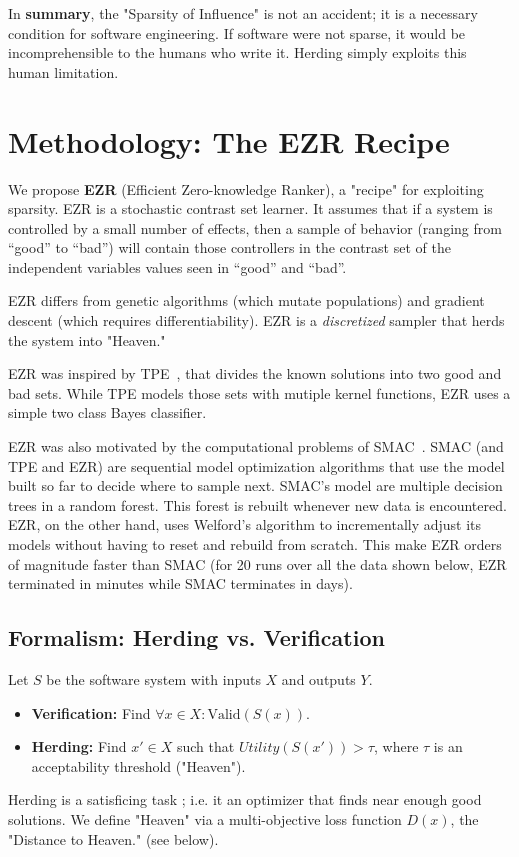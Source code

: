 \documentclass[runningheads]{llncs}
\begin{document}
In {\bf summary}, the "Sparsity of Influence" is not an accident; it is a 
necessary condition for software engineering. If software were not sparse, 
it would be incomprehensible to the humans who write it. Herding simply 
exploits this human limitation.

\section{Methodology: The EZR Recipe}
We propose \textbf{EZR} (Efficient Zero-knowledge Ranker), a "recipe" for 
exploiting sparsity. EZR is a stochastic contrast set learner.
It assumes that if a system is controlled by a small number of effects, then   a   sample of behavior (ranging from ``good'' to ``bad'') will contain those controllers in the  contrast set of the independent variables values seen in ``good'' and ``bad''. 

EZR differs 
from genetic algorithms (which mutate populations) and gradient descent 
(which requires differentiability). EZR is a \textit{discretized} sampler 
that herds the system into "Heaven."

EZR was inspired by TPE~\cite{Bergstra11}, that divides the known solutions into two good and bad sets.  While TPE models those sets with mutiple kernel functions, EZR uses a simple two class Bayes classifier.

EZR was also motivated by the computational problems of SMAC~\cite{hutter2011sequential}. SMAC (and TPE and EZR) are
sequential model optimization algorithms that use
the model built so far to decide where to sample
next. SMAC's model are  multiple decision trees in a random forest. This forest is rebuilt whenever new data is encountered. EZR, on the other hand, uses Welford's algorithm to incrementally adjust its models without having to reset and rebuild from scratch. This make EZR
orders of magnitude faster than SMAC (for 20 runs over all the data shown below, EZR terminated in minutes while SMAC terminates in days).

\subsection{Formalism: Herding vs. Verification}
Let $S$ be the software system with inputs $X$ and outputs $Y$.
\begin{itemize}
    \item \textbf{Verification:} Find $\forall x \in X: \text{Valid}(S(x))$.
    \item \textbf{Herding:} Find $x' \in X$ such that $Utility(S(x')) > \tau$, 
    where $\tau$ is an acceptability threshold ("Heaven").
\end{itemize}
Herding is a satisficing task \cite{Simon1956};
i.e. it an optimizer that finds near enough good solutions.
We define "Heaven" via a 
multi-objective loss function $D(x)$, the "Distance to Heaven." (see below).
\end{document}

